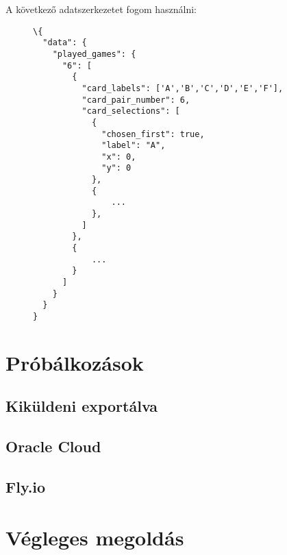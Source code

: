     \centering
A következő adatszerkezetet fogom használni: 
\begin{figure}[h]

 \begin{lstlisting}
\{
  "data": { 
    "played_games": {
      "6": [
        {
          "card_labels": ['A','B','C','D','E','F'], 
          "card_pair_number": 6,
          "card_selections": [ 
            {
              "chosen_first": true,
              "label": "A",
              "x": 0,
              "y": 0
            },
            {
                ...
            },
          ]
        },
        {
            ...
        }
      ]
    }
  }
}
\end{lstlisting}
\end{figure}
\section{Próbálkozások}
\subsection{Kiküldeni exportálva}
\subsection{Oracle Cloud}
\subsection{Fly.io}
\section{Végleges megoldás}
